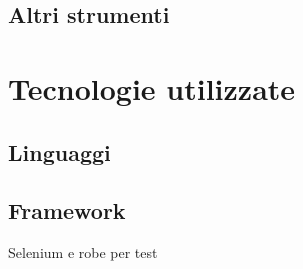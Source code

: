 \subsection{Altri strumenti}

\section{Tecnologie utilizzate}

\subsection{Linguaggi}

\subsection{Framework}
Selenium e robe per test 

